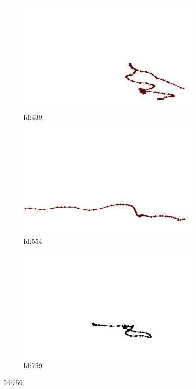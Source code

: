 \documentclass[12pt,twoside]{report}
\begin{document}
\begin{figure}
\centering
\begin{subfigure}[b]{0.20\textwidth}
\centering
\includegraphics[width=\textwidth]{../../trajectories/439.png}
\caption{Id:439}
\end{subfigure}
\begin{subfigure}[b]{0.20\textwidth}
\centering
\includegraphics[width=\textwidth]{../../trajectories/554.png}
\caption{Id:554}
\end{subfigure}
\begin{subfigure}[b]{0.20\textwidth}
\centering
\includegraphics[width=\textwidth]{../../trajectories/759.png}
\caption{Id:759}
\end{subfigure}
\end{figure}
\end{document}
